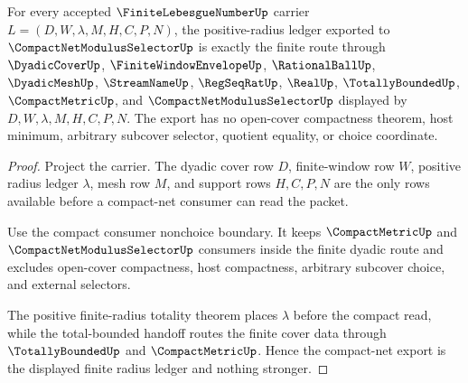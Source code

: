 \begin{theorem}
\label{thm:finite-lebesgue-number-positive-radius-compact-net-export}
For every accepted $\FiniteLebesgueNumberUp$ carrier $L=(D,W,\lambda,M,H,C,P,N)$, the positive-radius ledger exported to $\CompactNetModulusSelectorUp$ is exactly the finite route through $\DyadicCoverUp$, $\FiniteWindowEnvelopeUp$, $\RationalBallUp$, $\DyadicMeshUp$, $\StreamNameUp$, $\RegSeqRatUp$, $\RealUp$, $\TotallyBoundedUp$, $\CompactMetricUp$, and $\CompactNetModulusSelectorUp$ displayed by $D,W,\lambda,M,H,C,P,N$. The export has no open-cover compactness theorem, host minimum, arbitrary subcover selector, quotient equality, or choice coordinate.
\end{theorem}
\begin{proof}
Project the carrier. The dyadic cover row $D$, finite-window row $W$, positive radius ledger $\lambda$, mesh row $M$, and support rows $H,C,P,N$ are the only rows available before a compact-net consumer can read the packet.

Use the compact consumer nonchoice boundary. It keeps $\CompactMetricUp$ and $\CompactNetModulusSelectorUp$ consumers inside the finite dyadic route and excludes open-cover compactness, host compactness, arbitrary subcover choice, and external selectors.

The positive finite-radius totality theorem places $\lambda$ before the compact read, while the total-bounded handoff routes the finite cover data through $\TotallyBoundedUp$ and $\CompactMetricUp$. Hence the compact-net export is the displayed finite radius ledger and nothing stronger.
\end{proof}

